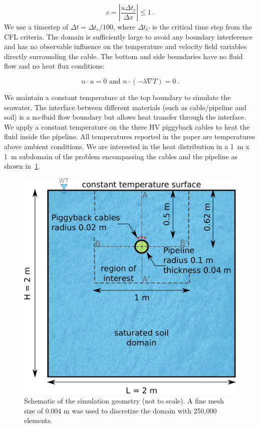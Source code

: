 \documentclass[Journal,letterpaper,InsideFigs]{ascelike-new}
\begin{document}
\begin{equation}
c = |\frac{u \Delta t_c}{\Delta x}| \le 1\,.
\end{equation}
\noindent We use a timestep of $\Delta t = \Delta t_c / 100$, where $\Delta t_C$ is the critical time step from the CFL criteria. The domain is sufficiently large to avoid any boundary interference and has no observable influence on the temperature and velocity field variables directly surrounding the cable. The bottom and side boundaries have no fluid flow and no heat flux conditions:

\begin{equation}
n \cdot u = 0 \text{ and } n \cdot (-\lambda \nabla T) = 0\,.
\end{equation}

We maintain a constant temperature at the top boundary to simulate the seawater. The interface between different materials (such as cable/pipeline and soil) is a no-fluid flow boundary but allows heat transfer through the interface. We apply a constant temperature on the three HV piggyback cables to heat the fluid inside the pipeline. All temperatures reported in the paper are temperatures above ambient conditions. We are interested in the heat distribution in a \SI{1}{\meter} x \SI{1}{\meter} subdomain of the problem encompassing the cables and the pipeline as shown in~\cref{fig:model}.

\begin{figure}[htbp]
    \centering
    \includegraphics[width=0.7\linewidth]{figs/model.pdf}
    \caption{Schematic of the simulation geometry (not to scale). A fine mesh size of 0.004 m was used to discretize the domain with 250,000 elements.}
    \label{fig:model}
\end{figure}
\end{document}
